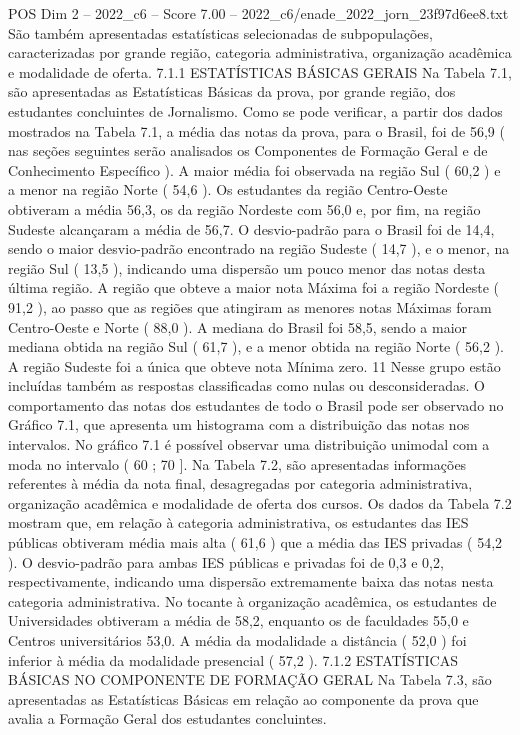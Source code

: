\begin{textsample}{POS Dim 2 – 2022\_c6 – Score 7.00 – 2022\_c6/enade\_2022\_jorn\_23f97d6ee8.txt}
São também apresentadas estatísticas selecionadas de subpopulações, caracterizadas por grande região, categoria administrativa, organização acadêmica e modalidade de oferta. 7.1.1 ESTATÍSTICAS BÁSICAS GERAIS Na Tabela 7.1, são apresentadas as Estatísticas Básicas da prova, por grande região, dos estudantes concluintes de Jornalismo.
Como se pode verificar, a partir dos dados mostrados na Tabela 7.1, a média das notas da prova, para o Brasil, foi de 56,9 ( nas seções seguintes serão analisados os Componentes de Formação Geral e de Conhecimento Específico ).
A maior média foi observada na região Sul ( 60,2 ) e a menor na região Norte ( 54,6 ).
Os estudantes da região Centro-Oeste obtiveram a média 56,3, os da região Nordeste com 56,0 e, por fim, na região Sudeste alcançaram a média de 56,7.
O desvio-padrão para o Brasil foi de 14,4, sendo o maior desvio-padrão encontrado na região Sudeste ( 14,7 ), e o menor, na região Sul ( 13,5 ), indicando uma dispersão um pouco menor das notas desta última região.
A região que obteve a maior nota Máxima foi a região Nordeste ( 91,2 ), ao passo que as regiões que atingiram as menores notas Máximas foram Centro-Oeste e Norte ( 88,0 ).
A mediana do Brasil foi 58,5, sendo a maior mediana obtida na região Sul ( 61,7 ), e a menor obtida na região Norte ( 56,2 ).
A região Sudeste foi a única que obteve nota Mínima zero. 11 Nesse grupo estão incluídas também as respostas classificadas como nulas ou desconsideradas.
O comportamento das notas dos estudantes de todo o Brasil pode ser observado no Gráfico 7.1, que apresenta um histograma com a distribuição das notas nos intervalos.
No gráfico 7.1 é possível observar uma distribuição unimodal com a moda no intervalo ( 60 ; 70 ].
Na Tabela 7.2, são apresentadas informações referentes à média da nota final, desagregadas por categoria administrativa, organização acadêmica e modalidade de oferta dos cursos.
Os dados da Tabela 7.2 mostram que, em relação à categoria administrativa, os estudantes das IES públicas obtiveram média mais alta ( 61,6 ) que a média das IES privadas ( 54,2 ).
O desvio-padrão para ambas IES públicas e privadas foi de 0,3 e 0,2, respectivamente, indicando uma dispersão extremamente baixa das notas nesta categoria administrativa.
No tocante à organização acadêmica, os estudantes de Universidades obtiveram a média de 58,2, enquanto os de faculdades 55,0 e Centros universitários 53,0.
A média da modalidade a distância ( 52,0 ) foi inferior à média da modalidade presencial ( 57,2 ). 7.1.2 ESTATÍSTICAS BÁSICAS NO COMPONENTE DE FORMAÇÃO GERAL Na Tabela 7.3, são apresentadas as Estatísticas Básicas em relação ao componente da prova que avalia a Formação Geral dos estudantes concluintes.

\end{textsample}
